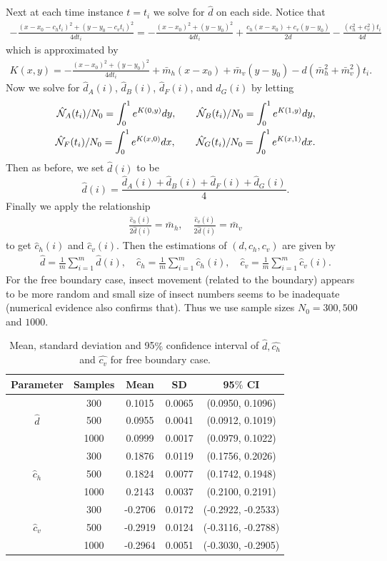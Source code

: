 \documentclass[11pt]{article}
\newcommand{\bean}{\begin{eqnarray*}}
\newcommand{\eean}{\end{eqnarray*}}
\begin{document}
Next at each time instance $t=t_i$ we solve for $\hat{d}$ on each side. Notice that 
\bean
-\frac{(x-x_0-c_ht_i)^2+(y-y_0-c_vt_i)^2}{4dt_i}=-\frac{(x-x_0)^2+(y-y_0)^2}{4dt_i}+\frac{c_h(x-x_0)+c_v(y-y_0)}{2d}-\frac{(c_h^2+c_v^2)t_i}{4d}
\eean
  which is approximated by
\bean
K(x, y)=-\frac{(x-x_0)^2+(y-y_0)^2}{4dt_i}+\bar{m}_h(x-x_0)+\bar{m}_v(y-y_0)-d(\bar{m}_h^2+\bar{m}_v^2)t_i.
\eean
Now we solve for $\hat{d}_A(i)$, $\hat{d}_B(i)$, $\hat{d}_F(i)$, and $\hat{d}_G(i)$ by letting
\bean
{\hat {\cal N}}_A(t_i)/N_0=\int_0^1 e^{K(0, y)}dy, \qquad \hat{{\cal N}}_B(t_i)/N_0=\int_0^1 e^{K(1, y)}dy,\\
\hat{{\cal N}}_F(t_i)/N_0=\int_0^1 e^{K(x, 0)}dx, \qquad \hat{{\cal N}}_G(t_i)/N_0=\int_0^1 e^{K(x, 1)}dx.
\eean
Then as before,  we set $\hat{d}(i)$ to be
\[\hat{d}(i)=\frac{\hat{d}_A(i)+\hat{d}_B(i)+\hat{d}_F(i)+\hat{d}_G(i)}{4}.\]
Finally we apply the relationship 
\bean
\frac{\hat{c}_h(i)}{2\hat{d}(i)}=\bar{m}_h, \quad \frac{\hat{c}_v(i)}{2\hat{d}(i)}=\bar{m}_v
\eean
to get $\hat{c}_h(i)$ and $\hat{c}_v(i)$. Then the estimations of $(d, c_h, c_v)$ are given by
\bean
\hat{d}=\frac{1}{m}\sum_{i=1}^m \hat{d}(i), \quad \hat{c}_h=\frac{1}{m}\sum_{i=1}^m \hat{c}_h(i), \quad \hat{c}_v=\frac{1}{m}\sum_{i=1}^m \hat{c}_v(i). 
\eean 
For the free boundary case, insect movement (related to the boundary) appears to be more random and small size of insect numbers seems to be inadequate (numerical evidence also confirms that). Thus we use sample sizes $N_0=300, 500$ and $1000$.
\begin{table}[!htbp]
\centering %
\begin{tabular}{ccccc} %
\hline\hline %
Parameter &Samples & Mean & SD & 95$\%$ CI
\\ [0.5ex]
\hline %
              &300  & 0.1015 & 0.0065 & (0.0950, 0.1096)  \\
$\hat{d}$     &500  & 0.0955 & 0.0041 & (0.0912, 0.1019)  \\
              &1000  & 0.0999 & 0.0017 & (0.0979, 0.1022)  \\
\hline
              &300  & 0.1876 & 0.0119 & (0.1756, 0.2026)  \\
$\hat{c}_{h}$ &500  & 0.1824 &0.0077& (0.1742, 0.1948)   \\
              &1000  & 0.2143 & 0.0037 & (0.2100, 0.2191)  \\
\hline
              &300  & -0.2706 & 0.0172 & (-0.2922, -0.2533)  \\
$\hat{c}_{v}$ &500 & -0.2919 &0.0124& (-0.3116, -0.2788) \\
              &1000  & -0.2964 & 0.0051 & (-0.3030, -0.2905)  \\
\hline\hline %
\end{tabular}
\caption{Mean, standard deviation and 95$\%$ confidence interval of $\hat{d}, \hat{c_{h}}$ and $\hat{c_{v}}$ for free boundary case.}
\label{tab:Estimation_of_Parameters_D_ch_cv}
\end{table}
\end{document}
